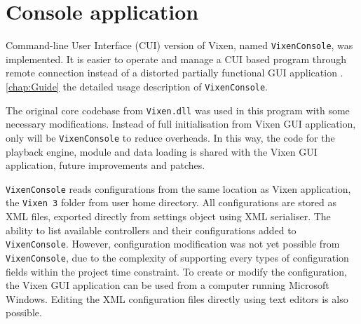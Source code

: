 \section{Console application}

 Command-line User Interface (CUI) version of Vixen, named \texttt{VixenConsole}, was implemented. It is easier to operate and manage a CUI based program through remote connection  instead of a distorted partially functional GUI application . \cref{chap:Guide}  the detailed usage description of \texttt{VixenConsole}.



The original core codebase from \texttt{Vixen.dll} was used in this program with some necessary modifications. Instead of full initialisation from Vixen GUI application, only  will be  \texttt{VixenConsole} to reduce overheads. In this way, the code for the playback engine, module and data loading is  shared with the Vixen GUI application,  future improvements and patches.

\texttt{VixenConsole} reads configurations from the same location as Vixen application, the \texttt{Vixen 3} folder from user home directory. All configurations are stored as XML files, exported directly from settings object using XML serialiser. The ability to list available controllers and their configurations  added to \texttt{VixenConsole}. However, configuration modification was not yet possible from \texttt{VixenConsole}, due to the complexity of supporting every  types of configuration fields within the project time constraint. To create or modify the configuration, the Vixen GUI application can be used from a computer running Microsoft Windows. Editing the XML configuration files directly using text editors is also possible.

